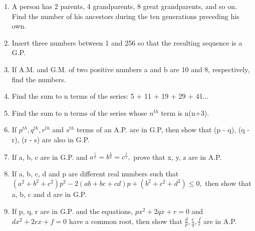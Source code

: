 \begin{enumerate}[label=\arabic*.,ref=\thesubsection.\theenumi]
\item A person has 2 parents, 4 grandparents, 8 great grandparents, and so on. Find the number of his ancestors during the ten generations preceding his own.
\item Insert three numbers between 1 and 256 so that the resulting sequence is a G.P.
\item If A.M. and G.M. of two positive numbers a and b are 10 and 8, respectively, find the numbers.
\item Find the sum to n terms of the series: 5 + 11 + 19 + 29 + 41...
\item Find the sum to n terms of the series whose $n^{th}$ term is n(n+3).
\item If $p^{th}, q^{th}, r^{th}$ and $s^{th}$ terms of an A.P. are in G.P, then show that (p - q), (q - r), (r - s) are also in G.P.
\item If a, b, c are in G.P. and $a^\frac{1}{x} = b^\frac{1}{y} = c^\frac{1}{z},$ prove that x, y, z are in A.P.
\item If a, b, c, d and p are different real numbers such that $(a^2 + b^2 + c^2 ) p^2 - 2(ab + bc + cd) p + (b^2 + c^2 + d^2 ) \leq 0,$ then show that a, b, c and d are in G.P.
\item If p, q, r are in G.P. and the equations, $px^2 + 2qx + r = 0$ and $dx^2 + 2ex + f = 0$ have a common root, then show that $\frac{d}{p}, \frac{e}{q}, \frac{f}{r}$ are in A.P.
\end{enumerate}
%
    
